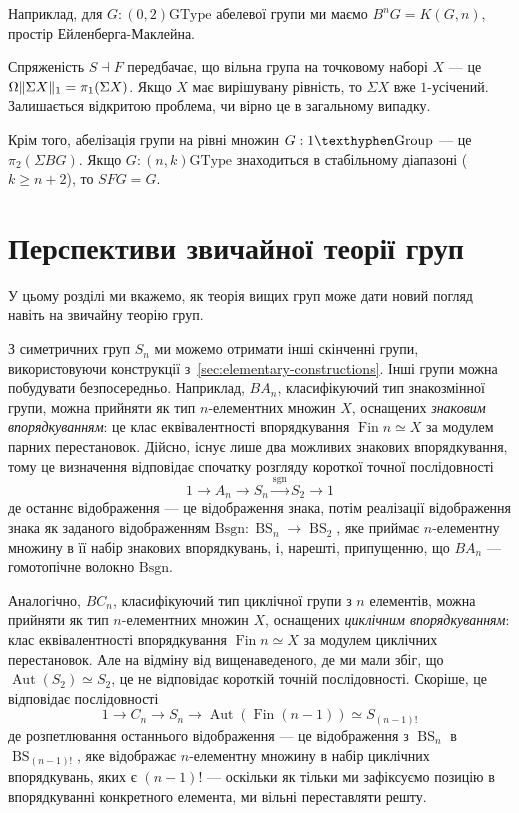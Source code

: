 \documentclass[12pt]{article}
\newcommand*{\Loop}{\Omega}
\newcommand*{\susp}[1]{{\Sigma}{#1}}
\renewcommand*{\equiv}{\mathrel{\simeq}}
\DeclarePairedDelimiter\trunc{\lVert}{\rVert}
\DeclareMathOperator\Aut{Aut}
\newcommand*\BS{\mathop{BS}}
\newcommand*\Sym{S}
\DeclareMathOperator\Fin{Fin}
\newcommand*{\GType}{\mathrm{GType}}
\newcommand*{\Grp}{\mathrm{\texthyphen Group}}
\begin{document}
Наприклад, для $G : (0,2)\GType$ абелевої групи ми маємо $B^nG = K(G,n)$, простір Ейленберга-Маклейна.

Спряженість ${S} \dashv {F}$ передбачає, що вільна група на точковому наборі $X$ — це $\Loop\trunc{\susp X}_1 = \pi_1(\susp X)$. Якщо $X$ має вирішувану рівність, то $\susp X$ вже $1$-усічений. Залишається відкритою проблема, чи вірно це в загальному випадку.

Крім того, абелізація групи на рівні множин $G : 1\Grp$ — це $\pi_2(\susp BG)$. Якщо $G : (n,k)\GType$ знаходиться в стабільному діапазоні ($k \ge n+2$), то $SFG = G$.

\section{Перспективи звичайної теорії груп}
\label{sec:perspectives}

У цьому розділі ми вкажемо, як теорія вищих груп може дати новий погляд навіть на звичайну теорію груп.

З симетричних груп $\Sym_n$ ми можемо отримати інші скінченні групи, використовуючи конструкції з~\autoref{sec:elementary-constructions}. Інші групи можна побудувати безпосередньо. Наприклад, $BA_n$, класифікуючий тип знакозмінної групи, можна прийняти як тип $n$-елементних множин $X$, оснащених \emph{знаковим впорядкуванням}: це клас еквівалентності впорядкування $\Fin n \equiv X$ за модулем парних перестановок. Дійсно, існує лише два можливих знакових впорядкування, тому це визначення відповідає спочатку розгляду короткої точної послідовності
\[
  1 \to A_n \to \Sym_n \xrightarrow{\mathrm{sgn}}{} \Sym_2 \to 1
\]
де останнє відображення — це відображення знака, потім реалізації відображення знака як заданого відображенням $\mathrm{Bsgn} : \BS_n \to \BS_2$, яке приймає $n$-елементну множину в її набір знакових впорядкувань, і, нарешті, припущенню, що $BA_n$ — гомотопічне волокно $\mathrm{Bsgn}$.

Аналогічно, $BC_n$, класифікуючий тип циклічної групи з $n$ елементів, можна прийняти як тип $n$-елементних множин $X$, оснащених \emph{циклічним впорядкуванням}: клас еквівалентності впорядкування $\Fin n \equiv X$ за модулем циклічних перестановок. Але на відміну від вищенаведеного, де ми мали збіг, що $\Aut(\Sym_2) \equiv \Sym_2$, це не відповідає короткій точній послідовності. Скоріше, це відповідає послідовності
\[
  1 \to C_n \to \Sym_n \to \Aut(\Fin(n-1)) \equiv \Sym_{(n-1)!}
\]
де розпетлювання останнього відображення — це відображення з $\BS_n$ в $\BS_{(n-1)!}$, яке відображає $n$-елементну множину в набір циклічних впорядкувань, яких є $(n-1)!$ — оскільки як тільки ми зафіксуємо позицію в впорядкуванні конкретного елемента, ми вільні переставляти решту.
\end{document}
